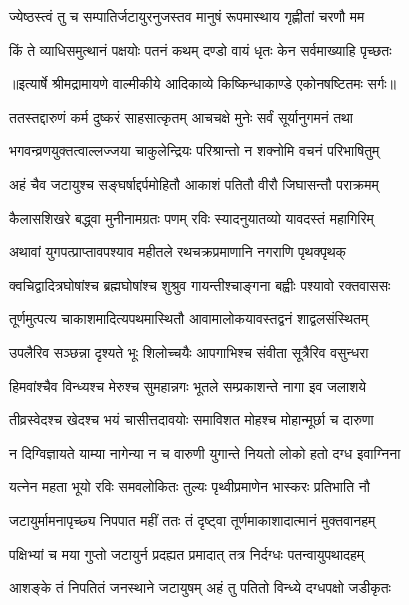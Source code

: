 \twolineshloka
{ज्येष्ठस्त्वं तु च सम्पातिर्जटायुरनुजस्तव}
{मानुषं रूपमास्थाय गृह्णीतां चरणौ मम} %

\twolineshloka
{किं ते व्याधिसमुत्थानं पक्षयोः पतनं कथम्}
{दण्डो वायं धृतः केन सर्वमाख्याहि पृच्छतः} %


{॥इत्यार्षे श्रीमद्रामायणे वाल्मीकीये आदिकाव्ये किष्किन्धाकाण्डे एकोनषष्टितमः सर्गः॥}


\twolineshloka
{ततस्तद्दारुणं कर्म दुष्करं साहसात्कृतम्}
{आचचक्षे मुनेः सर्वं सूर्यानुगमनं तथा} %

\twolineshloka
{भगवन्व्रणयुक्तत्वाल्लज्जया चाकुलेन्द्रियः}
{परिश्रान्तो न शक्नोमि वचनं परिभाषितुम्} %

\twolineshloka
{अहं चैव जटायुश्च सङ्घर्षाद्दर्पमोहितौ}
{आकाशं पतितौ वीरौ जिघासन्तौ पराक्रमम्} %

\twolineshloka
{कैलासशिखरे बद्ध्वा मुनीनामग्रतः पणम्}
{रविः स्यादनुयातव्यो यावदस्तं महागिरिम्} %

\twolineshloka
{अथावां युगपत्प्राप्तावपश्याव महीतले}
{रथचक्रप्रमाणानि नगराणि पृथक्पृथक्} %

\twolineshloka
{क्वचिद्वादित्रघोषांश्च ब्रह्मघोषांश्च शुश्रुव}
{गायन्तीश्चाङ्गना बह्वीः पश्यावो रक्तवाससः} %

\twolineshloka
{तूर्णमुत्पत्य चाकाशमादित्यपथमास्थितौ}
{आवामालोकयावस्तद्वनं शाद्वलसंस्थितम्} %

\twolineshloka
{उपलैरिव सञ्छन्ना दृश्यते भूः शिलोच्चयैः}
{आपगाभिश्च संवीता सूत्रैरिव वसुन्धरा} %

\twolineshloka
{हिमवांश्चैव विन्ध्यश्च मेरुश्च सुमहान्नगः}
{भूतले सम्प्रकाशन्ते नागा इव जलाशये} %

\twolineshloka
{तीव्रस्वेदश्च खेदश्च भयं चासीत्तदावयोः}
{समाविशत मोहश्च मोहान्मूर्छा च दारुणा} %

\twolineshloka
{न दिग्विज्ञायते याम्या नागेन्या न च वारुणी}
{युगान्ते नियतो लोको हतो दग्ध इवाग्निना} %

\twolineshloka
{यत्नेन महता भूयो रविः समवलोकितः}
{तुल्यः पृथ्वीप्रमाणेन भास्करः प्रतिभाति नौ} %

\twolineshloka
{जटायुर्मामनापृच्छ्य निपपात महीं ततः}
{तं दृष्ट्वा तूर्णमाकाशादात्मानं मुक्तवानहम्} %

\twolineshloka
{पक्षिभ्यां च मया गुप्तो जटायुर्न प्रदह्यत}
{प्रमादात् तत्र निर्दग्धः पतन्वायुपथादहम्} %

\twolineshloka
{आशङ्के तं निपतितं जनस्थाने जटायुषम्}
{अहं तु पतितो विन्ध्ये दग्धपक्षो जडीकृतः} %

